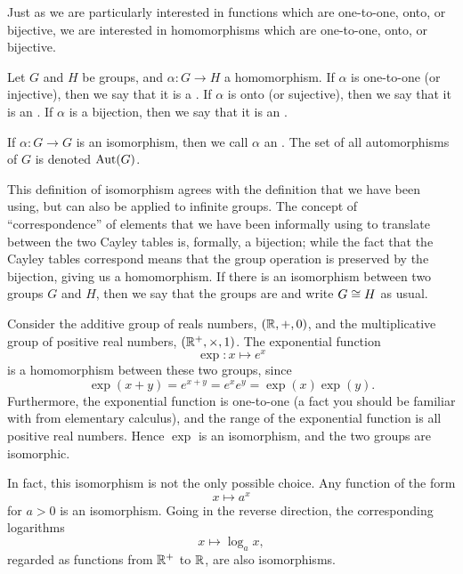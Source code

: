 Just as we are particularly interested in functions which are one-to-one,
onto, or bijective, we are interested in homomorphisms which are one-to-one,
onto, or bijective.

\begin{definition}
  Let $G$ and $H$ be groups, and $\alpha : G \to H$ a homomorphism.  If
  $\alpha$ is one-to-one (or injective), then we say that it is a
  .  If $\alpha$ is onto (or sujective),
  then we say that it is an .  If $\alpha$
  is a bijection, then we say that it is an .
  
  If $\alpha: G \to G$ is an isomorphism, then we call $\alpha$ an
  .  The set of all automorphisms of $G$
  is denoted $\operatorname{Aut}(G)$.
\end{definition}

This definition of isomorphism agrees with the definition that we have been
using, but can also be applied to infinite groups.  The concept of
``correspondence'' of elements that we have been informally using to translate
between the two Cayley tables is, formally, a bijection; while the fact that
the Cayley tables correspond means that the group operation is preserved by
the bijection, giving us a homomorphism.  If there is an isomorphism between
two groups $G$ and $H$, then we say that the groups are 
and write $G \cong H$ as usual.

\begin{example}
  Consider the additive group of reals numbers, $(\mathbb{R}, +, 0)$, and the
  multiplicative group of positive real numbers, $(\mathbb{R}^{+}, \times, 1)$.
  The exponential function
  \[
    \exp : x \mapsto e^{x}
  \]
  is a homomorphism between these two groups, since
  \[
    \exp(x+y) = e^{x+y} = e^{x}e^{y} = \exp(x)\exp(y).
  \]
  Furthermore, the exponential function is one-to-one (a fact you should be
  familiar with from elementary calculus), and the range of the exponential
  function is all positive real numbers.  Hence $\exp$ is an isomorphism, and
  the two groups are isomorphic.
  
  In fact, this isomorphism is not the only possible choice.  Any function
  of the form
  \[
    x \mapsto a^{x}
  \]
  for $a > 0$ is an isomorphism.  Going in the reverse direction, the
  corresponding logarithms
  \[
    x \mapsto \log_{a} x,
  \]
  regarded as functions from $\mathbb{R}^{+}$ to $\mathbb{R}$, are also isomorphisms.
\end{example}

